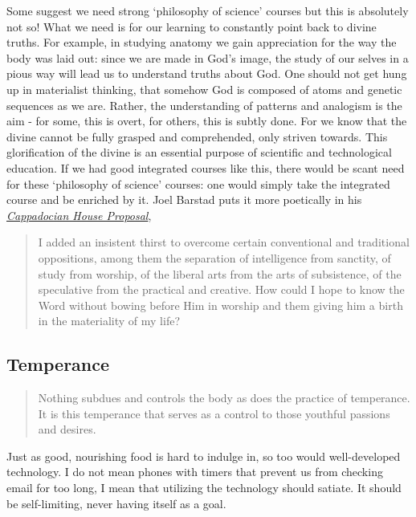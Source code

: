 \documentclass[letterpaper]{article}
\begin{document}
Some suggest we need strong `philosophy of science' courses but this is absolutely not so! What we need is for our learning to constantly point back to divine truths. For example, in studying anatomy we gain appreciation for the way the body was laid out: since we are made in God's image, the study of our selves in a pious way will lead us to understand truths about God. One should not get hung up in materialist thinking, that somehow God is composed of atoms and genetic sequences as we are. Rather, the understanding of patterns and analogism is the aim - for some, this is overt, for others, this is subtly done. For we know that the divine cannot be fully grasped and comprehended, only striven towards. This glorification of the divine is an essential purpose of scientific and technological education. If we had good integrated courses like this, there would be scant need for these `philosophy of science' courses: one would simply take the integrated course and be enriched by it. Joel Barstad puts it more poetically in his \href{https://byzantinela.com/cappadocian-house-proposal/}{\textit{Cappadocian House Proposal}},

\begin{quote}
  I added an insistent thirst to overcome certain conventional and traditional oppositions, among them the separation of intelligence from sanctity, of study from worship, of the liberal arts from the arts of subsistence, of the speculative from the practical and creative. How could I hope to know the Word without bowing before Him in worship and them giving him a birth in the materiality of my life?
\end{quote}


\subsection{Temperance}

\begin{quote}
  Nothing subdues and controls the body as does the practice of temperance. It is this temperance that serves as a control to those youthful passions and desires.
\end{quote}

Just as good, nourishing food is hard to indulge in, so too would well-developed technology. I do not mean phones with timers that prevent us from checking email for too long, I mean that utilizing the technology should satiate. It should be self-limiting, never having itself as a goal.
\end{document}
